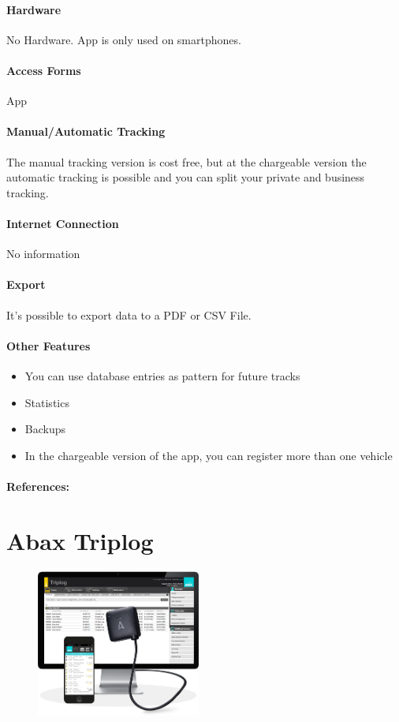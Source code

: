 \paragraph{Hardware} No Hardware. App is only used on smartphones.
\paragraph{Access Forms} App
\paragraph{Manual/Automatic Tracking} The manual tracking version is cost free, but at the chargeable version the automatic tracking is possible and you can split your private and business tracking.
\paragraph{Internet Connection} No information
\paragraph{Export} It’s possible to export data to a PDF or CSV File.
\paragraph{Other Features} 
\begin{itemize}
\item You can use database entries as pattern for future tracks
\item Statistics
\item Backups
\item In the chargeable version of the app, you can register more than one vehicle
\end{itemize}
\paragraph{References:} \cite{Drives_Fahrtenbuch}
\newpage

\section{Abax Triplog}
\begin{figure}
  \begin{center}
    \includegraphics[width=0.48\textwidth]{bilder/abax}
  \end{center}
\end{figure}
